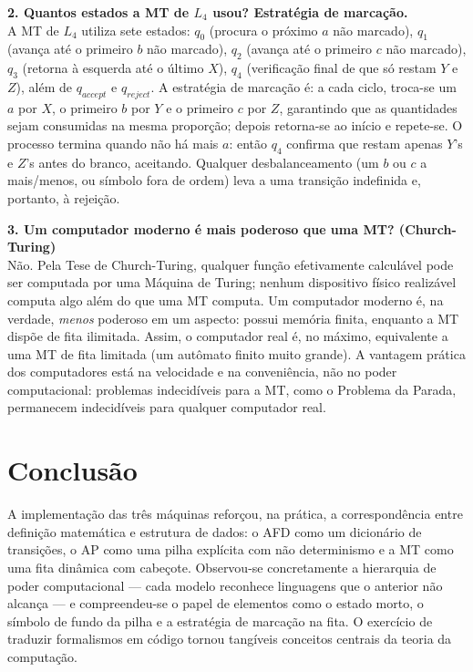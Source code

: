\documentclass[12pt,a4paper]{article}
\begin{document}
\noindent\textbf{2. Quantos estados a MT de $L_4$ usou? Estratégia de marcação.}\\
A MT de $L_4$ utiliza sete estados: $q_0$ (procura o próximo $a$ não marcado),
$q_1$ (avança até o primeiro $b$ não marcado), $q_2$ (avança até o primeiro $c$
não marcado), $q_3$ (retorna à esquerda até o último $X$), $q_4$ (verificação
final de que só restam $Y$ e $Z$), além de $q_{accept}$ e $q_{reject}$. A
estratégia de marcação é: a cada ciclo, troca-se um $a$ por $X$, o primeiro $b$ por
$Y$ e o primeiro $c$ por $Z$, garantindo que as quantidades sejam consumidas na
mesma proporção; depois retorna-se ao início e repete-se. O processo termina quando
não há mais $a$: então $q_4$ confirma que restam apenas $Y$'s e $Z$'s antes do
branco, aceitando. Qualquer desbalanceamento (um $b$ ou $c$ a mais/menos, ou
símbolo fora de ordem) leva a uma transição indefinida e, portanto, à rejeição.

\noindent\textbf{3. Um computador moderno é mais poderoso que uma MT? (Church-Turing)}\\
Não. Pela Tese de Church-Turing, qualquer função efetivamente calculável pode ser
computada por uma Máquina de Turing; nenhum dispositivo físico realizável computa
algo além do que uma MT computa. Um computador moderno é, na verdade,
\emph{menos} poderoso em um aspecto: possui memória finita, enquanto a MT dispõe de
fita ilimitada. Assim, o computador real é, no máximo, equivalente a uma MT de
fita limitada (um autômato finito muito grande). A vantagem prática dos
computadores está na velocidade e na conveniência, não no poder computacional:
problemas indecidíveis para a MT, como o Problema da Parada, permanecem
indecidíveis para qualquer computador real.

\newpage
\section{Conclusão}
A implementação das três máquinas reforçou, na prática, a correspondência entre
definição matemática e estrutura de dados: o AFD como um dicionário de transições,
o AP como uma pilha explícita com não determinismo e a MT como uma fita dinâmica
com cabeçote. Observou-se concretamente a hierarquia de poder computacional ---
cada modelo reconhece linguagens que o anterior não alcança --- e compreendeu-se
o papel de elementos como o estado morto, o símbolo de fundo da pilha e a
estratégia de marcação na fita. O exercício de traduzir formalismos em código
tornou tangíveis conceitos centrais da teoria da computação.
\end{document}
